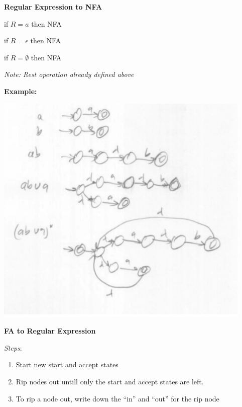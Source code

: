 \documentclass[oneside, 12pt]{book}
\begin{document}
\textbf{Regular Expression to NFA}

if $R = a$ then NFA


if $R = \epsilon$ then NFA




if $R = \emptyset$ then NFA


\emph{Note: Rest operation already defined above}


\textbf{Example:}

\includegraphics[width=\textwidth]{retonfa}


\textbf{FA to Regular Expression}

\emph{Steps}:

\begin{enumerate}

  \item Start new start and accept states
  \item Rip nodes out untill only the start and accept states are left.
  \item To rip a node out, write down the ``in'' and ``out'' for the rip node
\end{enumerate}
\end{document}
